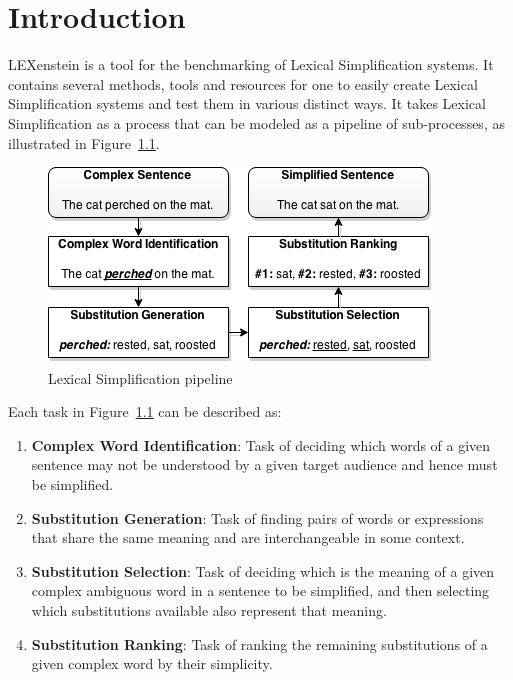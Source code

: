 \chapter{Introduction}

LEXenstein is a tool for the benchmarking of Lexical Simplification systems. It contains several methods, tools and resources for one to easily create Lexical Simplification systems and test them in various distinct ways. It takes Lexical Simplification as a process that can be modeled as a pipeline of sub-processes, as illustrated in Figure~\ref{fig:exlepipe}.

\begin{figure}[htbp!] 
\centering    
\includegraphics[scale=0.8]{Figs/diagramshadow.png}
\caption{Lexical Simplification pipeline}
\label{fig:exlepipe}
\end{figure}

Each task in Figure~\ref{fig:exlepipe} can be described as:

\begin{enumerate}
\item \textbf{Complex Word Identification}: Task of deciding which words of a given sentence may not be understood by a given target audience and hence must be simplified.

\item \textbf{Substitution Generation}: Task of finding pairs of words or expressions that share the same meaning and are interchangeable in some context.

\item \textbf{Substitution Selection}: Task of deciding which is the meaning of a given complex ambiguous word in a sentence to be simplified, and then selecting which substitutions available also represent that meaning.

\item \textbf{Substitution Ranking}: Task of ranking the remaining substitutions of a given complex word by their simplicity.
\end{enumerate}

